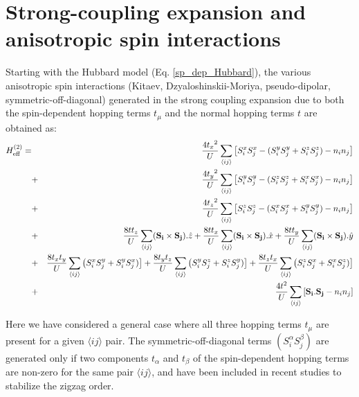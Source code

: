 \documentclass[aps,prb,fleqn,12pt,amsmath,amssymb]{revtex4}
\begin{document}
\appendix
\section{Strong-coupling expansion and anisotropic spin interactions}

Starting with the Hubbard model (Eq. \ref{sp_dep_Hubbard}), the various anisotropic spin interactions (Kitaev, Dzyaloshinskii-Moriya, pseudo-dipolar, symmetric-off-diagonal) generated in the strong coupling expansion due to both the spin-dependent hopping terms $t_\mu$ and the normal hopping terms $t$ are obtained as:
\begin{eqnarray}
H_{\rm eff} ^{(2)} = & & \frac{{4t_x}^2}{U} \sum_{\langle ij \rangle}
\left [ S_i ^x S_j ^x - (S_i ^y S_j ^y + S_i ^z S_j ^z) - n_i n_j \right ] \\ \nonumber 
&+& \frac{{4t_y}^2}{U} \sum_{\langle ij \rangle} 
\left [ S_i ^y S_j ^y - (S_i ^z S_j ^z + S_i ^x S_j ^x) - n_i n_j \right ] \\ \nonumber 
&+& \frac{{4t_z}^2}{U} \sum_{\langle ij \rangle}  
\left [ S_i ^z S_j ^z - (S_i ^x S_j ^x + S_i ^y S_j ^y) - n_i n_j \right ] \\ \nonumber 
&+& \frac{8t{t_z}}{U} \sum_{\langle ij \rangle} ({\bf S_i} \times {\bf S_j}).\hat{z}
+ \frac{8t{t_x}}{U} \sum_{\langle ij \rangle} ({\bf S_i} \times {\bf S_j}).\hat{x}
+ \frac{8t{t_y}}{U} \sum_{\langle ij \rangle} ({\bf S_i} \times {\bf S_j}).\hat{y} \\ \nonumber
&+& \frac{8t_x t_y}{U} \sum_{\langle ij \rangle}  
\left ( S_i ^x S_j ^y + S_i ^y S_j ^x) \right ] 
+ \frac{8t_y t_z}{U} \sum_{\langle ij \rangle} 
\left ( S_i ^y S_j ^z + S_i ^z S_j ^y) \right ] 
+ \frac{8t_z t_x}{U} \sum_{\langle ij \rangle}
\left ( S_i ^z S_j ^x + S_i ^x S_j ^z) \right ] \\ \nonumber 
&+& \frac{4t^2}{U} \sum_{\langle ij \rangle} \left [ {\bf S_i} . {\bf S_j} -  n_i n_j \right ]
\end{eqnarray}

Here we have considered a general case where all three hopping terms $t_\mu$ are present for a given $\langle ij \rangle$ pair. The symmetric-off-diagonal terms $(S_i ^\alpha S_j ^\beta)$ are generated only if two components $t_\alpha$ and $t_\beta$ of the spin-dependent hopping terms are non-zero for the same pair $\langle ij \rangle$, and have been included in recent studies to stabilize the zigzag order.\cite{chaloupka_PRL_2013} 
\end{document}
